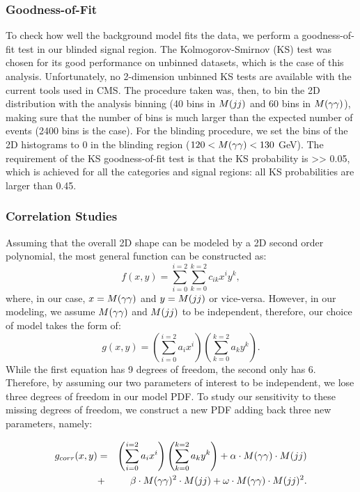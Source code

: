 \subsubsection{Goodness-of-Fit}

To check how well the background model fits the data, we perform a goodness-of-fit test in our blinded signal region.
The Kolmogorov-Smirnov (KS) test was chosen for its good performance on unbinned datasets, which is the case of this analysis.
Unfortunately, no 2-dimension unbinned KS tests are available with the current tools used in CMS.
The procedure taken was, then, to bin the 2D distribution with the analysis binning (40 bins in $M(jj)$ and 60 bins in $M(\gamma\gamma)$), making sure that the number of bins is much larger than the expected number of events (2400 bins is the case).
For the blinding procedure, we set the bins of the 2D histograms to 0 in the blinding region ($120 < M(\gamma\gamma) < 130$ GeV).
The requirement of the KS goodness-of-fit test is that the KS probability is >> 0.05, which is achieved for all the categories and signal regions: all KS probabilities are larger than 0.45.

\subsubsection{Correlation Studies}

Assuming that the overall 2D shape can be modeled by a 2D second order polynomial, the most general function can be constructed as:
\begin{equation}
f(x,y) = \sum_{i=0}^{i=2}\sum_{k=0}^{k=2}c_{ik}x^{i}y^{k},
\end{equation}
where, in our case, $x = M(\gamma\gamma)$ and $y = M(jj)$ or vice-versa. 
However, in our modeling, we assume $M(\gamma\gamma)$ and $M(jj)$ to be independent, therefore, our choice of model takes the form of:
\begin{equation}
g(x,y) = \left( \sum_{i=0}^{i=2} a_{i} x^{i}\right)\left( \sum_{k=0}^{k=2} a_{k} y^{k} \right).
\end{equation}
While the first equation has 9 degrees of freedom, the second only has 6. 
Therefore, by assuming our two parameters of interest to be independent, we lose three degrees of freedom in our model PDF. 
To study our sensitivity to these missing degrees of freedom, we construct a new PDF adding back three new parameters, namely:

\begin{eqnarray}
g_{corr}(x,y) &=& \left( \sum_{i=0}^{i=2} a_{i} x^{i}\right)\left( \sum_{k=0}^{k=2} a_{k} y^{k} \right) + \alpha\cdot M(\gamma\gamma)\cdot M(jj) \\
&+& \beta\cdot M(\gamma\gamma)^{2}\cdot M(jj)+ \omega\cdot M(\gamma\gamma)\cdot M(jj)^{2}.
\end{eqnarray}

